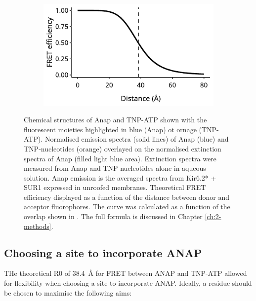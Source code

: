 \begin{figure}[h]
{\begin{subfigure}[t]{0.5\textwidth}
	\end{subfigure}
	\hfill
	\begin{subfigure}[t]{0.5\textwidth}
		\caption{}\label{ch3fig:fret_efficiency}
		\centering
		\includegraphics[width=\textwidth]{fret_efficiency.pdf}
	\end{subfigure}
	}
	\caption[Anap and TNP-nucleotides as FRET pairs]{
		 Chemical structures of Anap and TNP-ATP shown with the fluorescent moieties highlighted in blue (Anap) ot ornage (TNP-ATP).
		 Normalised emission spectra (solid lines) of Anap (blue) and TNP-nucleotides (orange) overlayed on the normalised extinction spectra of Anap (filled light blue area).
		Extinction spectra were measured from Anap and TNP-nucleotides alone in aqueous solution.
		Anap emission is the averaged spectra from Kir6.2* + SUR1 expressed in unroofed membranes.
		 Theoretical FRET efficiency displayed as a function of the distance between donor and acceptor fluorophores.
		The curve was calculated as a function of the overlap shown in .
		The full formula is discussed in Chapter \ref{ch:2-methods}.
	}

\end{figure}

\subsection{Choosing a site to incorporate ANAP}

THe theoretical R0 of \SI{38.4}{\angstrom} for FRET between ANAP and TNP-ATP allowed for flexibility when choosing a site to incorporate ANAP.
Ideally, a residue should be chosen to maximise the following aims:

